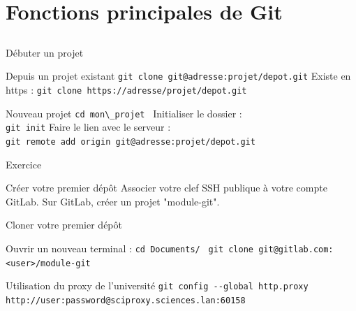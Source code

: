 \documentclass{beamer}
\begin{document}
\section{Fonctions principales de Git}
\subsection{}

\begin{frame}[fragile]{Débuter un projet}

  \begin{block}{Depuis un projet existant}
    \textcolor{commandcolor}{\verb?git clone git@adresse:projet/depot.git?}\linebreak
    Existe en https :\linebreak
    \textcolor{commandcolor}{\verb?git clone https://adresse/projet/depot.git?}
  \end{block}
  \begin{block}{Nouveau projet}
    \textcolor{commandcolor}{\verb?cd mon\_projet ?}\linebreak
    Initialiser le dossier :\\
    \textcolor{commandcolor}{\verb?git init?}\linebreak
    Faire le lien avec le serveur :\\
    \textcolor{commandcolor}{\verb?git remote add origin git@adresse:projet/depot.git?}
  \end{block}
\end{frame}

\begin{frame}[fragile]{Exercice}
  
  
  \begin{exampleblock}{Créer votre premier dépôt}
    Associer votre clef SSH publique à votre compte GitLab.\linebreak
    Sur GitLab, créer un projet "module-git".%
  \end{exampleblock}
  
  \begin{exampleblock}{Cloner votre premier dépôt}
    \begin{small}
      Ouvrir un nouveau terminal :\linebreak
      \textcolor{commandcolor}{\verb?cd Documents/ ?}\linebreak
      \textcolor{commandcolor}{\verb?git clone git@gitlab.com:<user>/module-git ?}
    \end{small}
  \end{exampleblock}
  
  \begin{alertblock}{Utilisation du proxy de l'université}
      \textcolor{commandcolor}{\verb?git config --global http.proxy  http://user:password@sciproxy.sciences.lan:60158?}
  \end{alertblock}
  
\end{frame}
\end{document}
